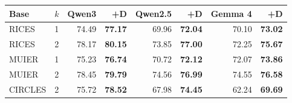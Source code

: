 \begin{tabular}{llrrrrrr}
\toprule
Base & $k$ & Qwen3 & +D & Qwen2.5 & +D & Gemma 4 & +D \\
\midrule
RICES & 1 & 74.49 & \textbf{77.17} & 69.96 & \textbf{72.04} & 70.10 & \textbf{73.02} \\
RICES & 2 & 78.17 & \textbf{80.15} & 73.85 & \textbf{77.00} & 72.25 & \textbf{75.67} \\
MUIER & 1 & 75.23 & \textbf{76.74} & 70.72 & \textbf{72.12} & 72.07 & \textbf{73.86} \\
MUIER & 2 & 78.45 & \textbf{79.79} & 74.56 & \textbf{76.99} & 74.55 & \textbf{76.58} \\
CIRCLES & 2 & 75.72 & \textbf{78.52} & 67.98 & \textbf{74.45} & 62.24 & \textbf{69.69} \\
\bottomrule
\end{tabular}
